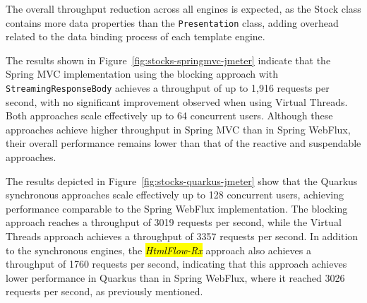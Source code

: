 \documentclass[software,article,accept,pdftex,moreauthors]{Definitions/mdpi}
\begin{document}
The overall throughput reduction across all engines is expected, as the Stock
class contains more data properties than the \texttt{Presentation} class,
adding overhead related to the data binding process of each template engine.



The results shown in Figure~\ref{fig:stocks-springmvc-jmeter} indicate that the
Spring MVC implementation using the blocking approach with
\texttt{StreamingResponseBody} achieves a throughput of up to 1,916 requests
per second, with no significant improvement observed when using Virtual
Threads. Both approaches scale effectively up to 64 concurrent users. Although
these approaches achieve higher throughput in Spring MVC than in Spring
WebFlux, their overall performance remains lower than that of the reactive and
suspendable approaches.

The results depicted in Figure~\ref{fig:stocks-quarkus-jmeter} show that the
Quarkus synchronous approaches scale effectively up to 128 concurrent users,
achieving performance comparable to the Spring WebFlux implementation. The
blocking approach reaches a throughput of 3019 requests per second, while the
Virtual Threads approach achieves a throughput of 3357 requests per second. In
addition to the synchronous engines, the \textit{\hl{HtmlFlow-Rx}} approach also
achieves a throughput of 1760 requests per second, indicating that this
approach achieves lower performance in Quarkus than in Spring WebFlux, where it
reached 3026 requests per second, as previously mentioned.
\end{document}
